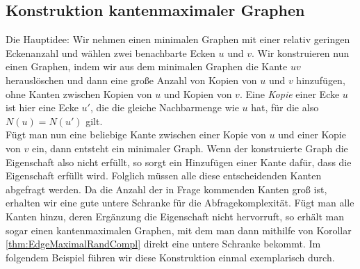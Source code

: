 \documentclass[10pt,a4paper, footheight=1mm]{scrreprt}
\theoremstyle{definition}
\begin{document}
\subsection{Konstruktion kantenmaximaler Graphen}
Die Hauptidee: Wir nehmen einen minimalen Graphen mit einer
relativ geringen Eckenanzahl und wählen zwei benachbarte Ecken
$u$ und $v$. Wir konstruieren nun einen Graphen, indem wir aus dem
minimalen Graphen die Kante $uv$ herauslöschen und dann eine große
Anzahl von Kopien von $u$ und $v$ hinzufügen, ohne Kanten zwischen
Kopien von $u$ und Kopien von $v$.
Eine \emph{Kopie} einer Ecke $u$ ist hier
eine Ecke $u'$, die die gleiche Nachbarmenge wie $u$ hat, für
die also $N(u)=N(u')$ gilt.\\
Fügt man nun eine beliebige Kante zwischen einer Kopie von $u$ und einer
Kopie von $v$ ein, dann entsteht ein minimaler Graph. Wenn der
konstruierte Graph die Eigenschaft also nicht erfüllt, so sorgt 
ein Hinzufügen einer Kante dafür, dass die Eigenschaft erfüllt wird.
Folglich müssen alle diese entscheidenden Kanten abgefragt werden.
Da die Anzahl der in Frage kommenden Kanten groß ist, erhalten
wir eine gute untere Schranke für die Abfragekomplexität.
Fügt man alle Kanten hinzu, deren Ergänzung die Eigenschaft
nicht hervorruft, so erhält man sogar einen kantenmaximalen Graphen,
mit dem man dann mithilfe von Korollar \ref{thm:EdgeMaximalRandCompl}
direkt eine untere Schranke bekommt.
Im folgendem Beispiel führen wir diese Konstruktion einmal
exemplarisch durch.
\end{document}
